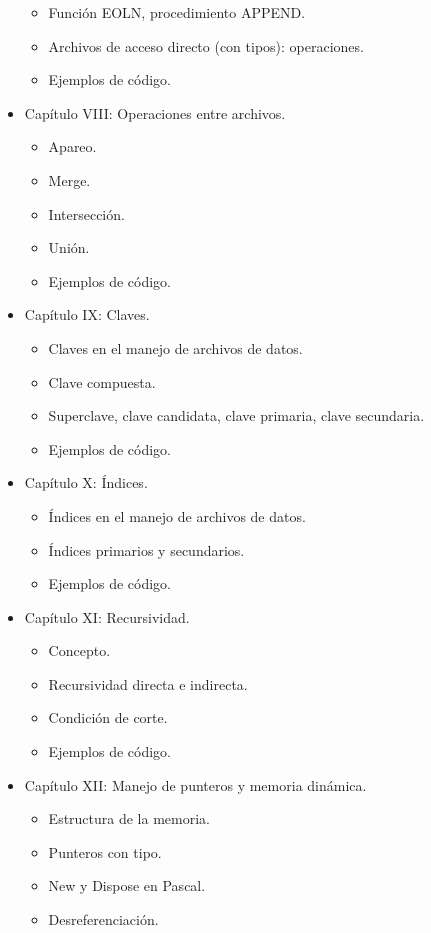 \documentclass{article}
\begin{document}
\begin{itemize}
\begin{itemize}
	\item Función EOLN, procedimiento APPEND.
	\item Archivos de acceso directo (con tipos): operaciones.
	\item Ejemplos de código.
	\end{itemize}
\item Capítulo VIII: Operaciones entre archivos.
	\begin{itemize}
	\item Apareo.
	\item Merge.
	\item Intersección.
	\item Unión.
	\item Ejemplos de código.
	\end{itemize}
\item Capítulo IX: Claves.
	\begin{itemize}
	\item Claves en el manejo de archivos de datos.
	\item Clave compuesta.
	\item Superclave, clave candidata, clave primaria, clave secundaria.
	\item Ejemplos de código.
	\end{itemize}
\item Capítulo X: Índices.
	\begin{itemize}
	\item Índices en el manejo de archivos de datos.
	\item Índices primarios y secundarios.
	\item Ejemplos de código.
	\end{itemize}
\item Capítulo XI: Recursividad.
	\begin{itemize}
	\item Concepto.
	\item Recursividad directa e indirecta.
	\item Condición de corte.
	\item Ejemplos de código.
	\end{itemize}
\item Capítulo XII: Manejo de punteros y memoria dinámica.
	\begin{itemize}
	\item Estructura de la memoria.
	\item Punteros con tipo.
	\item New y Dispose en Pascal.
	\item Desreferenciación.

\end{itemize}
\end{itemize}
\end{document}
